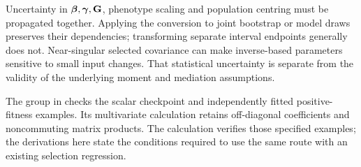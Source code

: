 Uncertainty in \(\boldsymbol{\beta},\boldsymbol{\gamma},\mathbf{G}\), phenotype scaling and population
centring must be propagated together. Applying the conversion to joint
bootstrap or model draws preserves their dependencies; transforming separate
interval endpoints generally does not. Near-singular selected covariance can
make inverse-based parameters sensitive to small input changes. That
statistical uncertainty is separate from the validity of the underlying
moment and mediation assumptions.

The group  in
 checks the scalar
checkpoint and independently fitted positive-fitness examples. Its
multivariate calculation retains off-diagonal coefficients and noncommuting
matrix products. The calculation verifies those specified examples; the
derivations here state the conditions required to use the same route with
an existing selection regression.
